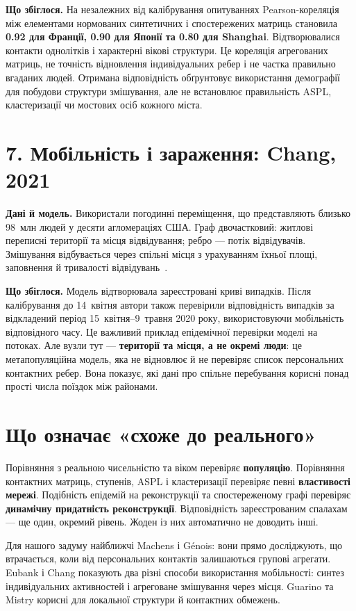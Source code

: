\documentclass[11pt,a4paper]{article}
\begin{document}
\textbf{Що збіглося.} На незалежних від калібрування опитуваннях Pearson-кореляція між елементами нормованих синтетичних і спостережених матриць становила \textbf{0.92 для Франції, 0.90 для Японії та 0.80 для Shanghai}. Відтворювалися контакти однолітків і характерні вікові структури. Це кореляція агрегованих матриць, не точність відновлення індивідуальних ребер і не частка правильно вгаданих людей. Отримана відповідність обґрунтовує використання демографії для побудови структури змішування, але не встановлює правильність ASPL, кластеризації чи мостових осіб кожного міста.

\section*{7. Мобільність і зараження: Chang, 2021}
\textbf{Дані й модель.} Використали погодинні переміщення, що представляють близько 98~млн людей у десяти агломераціях США. Граф двочастковий: житлові переписні території та місця відвідування; ребро --- потік відвідувачів. Змішування відбувається через спільні місця з урахуванням їхньої площі, заповнення й тривалості відвідувань~\cite{chang}.

\textbf{Що збіглося.} Модель відтворювала зареєстровані криві випадків. Після калібрування до 14~квітня автори також перевірили відповідність випадків за відкладений період 15~квітня--9~травня 2020 року, використовуючи мобільність відповідного часу. Це важливий приклад епідемічної перевірки моделі на потоках. Але вузли тут --- \textbf{території та місця, а не окремі люди}: це метапопуляційна модель, яка не відновлює й не перевіряє список персональних контактних ребер. Вона показує, які дані про спільне перебування корисні понад прості числа поїздок між районами.

\section*{Що означає «схоже до реального»}
Порівняння з реальною чисельністю та віком перевіряє \textbf{популяцію}. Порівняння контактних матриць, ступенів, ASPL і кластеризації перевіряє певні \textbf{властивості мережі}. Подібність епідемій на реконструкції та спостереженому графі перевіряє \textbf{динамічну придатність реконструкції}. Відповідність зареєстрованим спалахам --- ще один, окремий рівень. Жоден із них автоматично не доводить інші.

Для нашого задуму найближчі Machens і Génois: вони прямо досліджують, що втрачається, коли від персональних контактів залишаються групові агрегати. Eubank і Chang показують два різні способи використання мобільності: синтез індивідуальних активностей і агреговане змішування через місця. Guarino та Mistry корисні для локальної структури й контактних обмежень.
\end{document}
